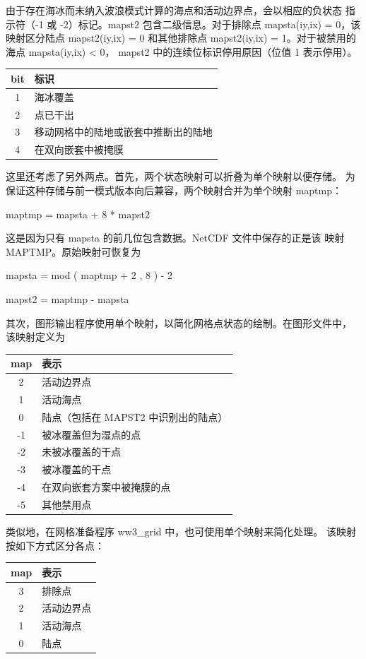 由于存在海冰而未纳入波浪模式计算的海点和活动边界点，会以相应的负状态
指示符（-1 或 -2）标记。{\F mapst2} 包含二级信息。对于排除点
{\F mapsta(iy,ix) = 0}，该映射区分陆点 {\F mapst2(iy,ix) = 0} 和其他排除点
{\F mapst2(iy,ix) = 1}。对于被禁用的海点 {\F mapsta(iy,ix) < 0}，
{\F mapst2} 中的连续位标识停用原因（位值 1 表示停用）。

\begin{center} \begin{tabular}{cl}
 bit & 标识 \\ \hline
  1  & 海冰覆盖     \\
  2  & 点已干出  \\
  3  & 移动网格中的陆地或嵌套中推断出的陆地 \\
  4  & 在双向嵌套中被掩膜
\end{tabular} \end{center}

这里还考虑了另外两点。首先，两个状态映射可以折叠为单个映射以便存储。
为保证这种存储与前一模式版本向后兼容，两个映射合并为单个映射 {\F maptmp}：

\vspace{\baselineskip}
\centerline{\F maptmp = mapsta + 8 * mapst2}
\vspace{\baselineskip}

\noindent
这是因为只有 {\F mapsta} 的前几位包含数据。NetCDF 文件中保存的正是该
映射 MAPTMP。原始映射可恢复为

\vspace{\baselineskip}
\centerline{\F mapsta = mod ( maptmp + 2 , 8 ) - 2}
\centerline{\F mapst2 = maptmp - mapsta}
\vspace{\baselineskip}

\noindent
其次，图形输出程序使用单个映射，以简化网格点状态的绘制。在图形文件中，
该映射定义为

\begin{center} \begin{tabular}{cl}
{map} & 表示 \\ \hline
  2 & 活动边界点 \\
  1 & 活动海点      \\
  0 & 陆点（包括在 {\F MAPST2} 中识别出的陆点） \\
 -1 & 被冰覆盖但为湿点的点 \\
 -2 & 未被冰覆盖的干点 \\
 -3 & 被冰覆盖的干点 \\
 -4 & 在双向嵌套方案中被掩膜的点 \\
 -5 & 其他禁用点
\end{tabular} \end{center}

\noindent
类似地，在网格准备程序 {\file ww3\_grid} 中，也可使用单个映射来简化处理。
该映射按如下方式区分各点：

\begin{center} \begin{tabular}{cl}
{map} & 表示 \\ \hline
  3 & 排除点 \\
  2 & 活动边界点 \\
  1 & 活动海点      \\
  0 & 陆点 
\end{tabular} \end{center}
